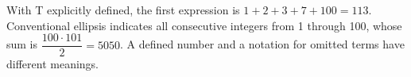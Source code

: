 With T explicitly defined, the first expression is $1+2+3+7+100=\boxed{113}$. Conventional ellipsis indicates all consecutive integers from 1 through 100, whose sum is $\dfrac{100\cdot 101}{2}=\boxed{5050}$. A defined number and a notation for omitted terms have different meanings.
